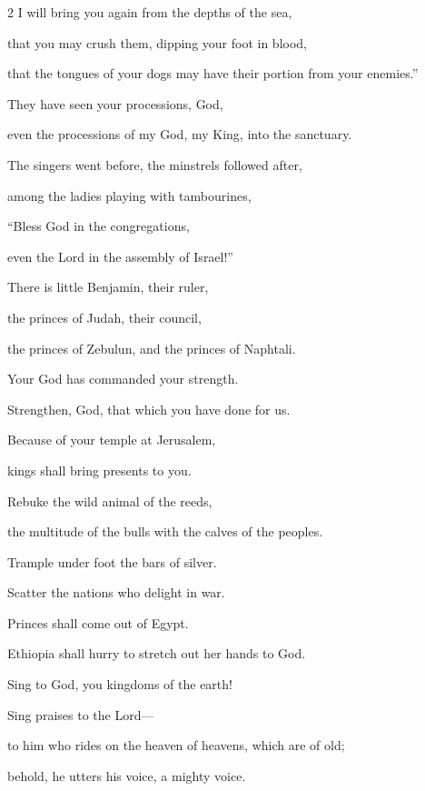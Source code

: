 \begin{multicols}{2}
	I will bring you again from the depths of the sea,
	
	
	\myverse{}that you may crush them, dipping your foot in blood,
	
	that the tongues of your dogs may have their portion from your enemies.”
	
	
	\myverse{}They have seen your processions, God,
	
	even the processions of my God, my King, into the sanctuary.
	
	
	\myverse{}The singers went before, the minstrels followed after,
	
	among the ladies playing with tambourines,
	
	
	\myverse{}“Bless God in the congregations,
	
	even the Lord in the assembly of Israel!”
	
	
	\myverse{}There is little Benjamin, their ruler,
	
	the princes of Judah, their council,
	
	the princes of Zebulun, and the princes of Naphtali.
	
	\vspace{\baselineskip}
	
	\myverse{}Your God has commanded your strength.
	
	Strengthen, God, that which you have done for us.
	
	
	\myverse{}Because of your temple at Jerusalem,
	
	kings shall bring presents to you.
	
	
	\myverse{}Rebuke the wild animal of the reeds,
	
	the multitude of the bulls with the calves of the peoples.
	
	Trample under foot the bars of silver.
	
	Scatter the nations who delight in war.
	
	
	\myverse{}Princes shall come out of Egypt.
	
	Ethiopia shall hurry to stretch out her hands to God.
	
	
	\myverse{}Sing to God, you kingdoms of the earth!
	
	Sing praises to the Lord---
	
	\vspace{\baselineskip}	
	
	
	\myverse{}to him who rides on the heaven of heavens, which are of old;
	
	behold, he utters his voice, a mighty voice.
	

\end{multicols}
